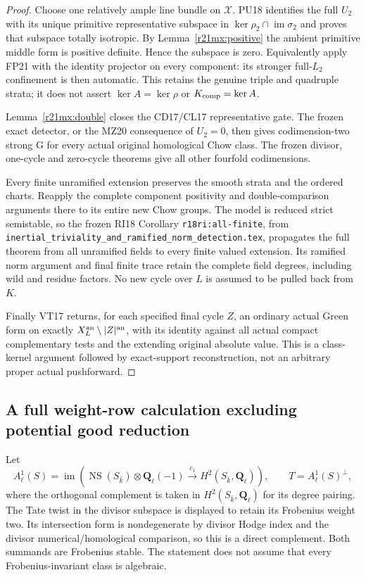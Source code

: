 \begin{proof}
Choose one relatively ample line bundle on $\mathcal X$.  PU18
identifies the full $U_2$ with its unique primitive representative
subspace in $\ker\rho_2\cap\operatorname{im}\sigma_2$ and proves that
subspace totally isotropic.  By Lemma~\ref{r21mx:positive} the ambient
primitive middle form is positive definite.  Hence the subspace is
zero.  Equivalently apply FP21 with the identity projector on every
component: its stronger full-$L_2$ confinement is then automatic.
This retains the genuine triple and quadruple strata; it does not
assert $\ker A=\ker\rho$ or $K_{\rm comp}=\ker A$.

Lemma~\ref{r21mx:double} closes the CD17/CL17 representative gate.
The frozen exact detector, or the MZ20 consequence of $U_2=0$,
then gives codimension-two strong G for every actual original
homological Chow class.  The frozen divisor, one-cycle and zero-cycle
theorems give all other fourfold codimensions.

Every finite unramified extension preserves the smooth strata and
the ordered charts.  Reapply the complete component positivity and
double-comparison arguments there to its entire new Chow groups.
The model is reduced strict semistable, so the frozen RI18
Corollary \texttt{r18ri:all-finite}, from
\texttt{inertial\_triviality\_and\_ramified\_norm\_detection.tex},
propagates the full theorem from all unramified fields to every finite
valued extension.  Its ramified norm argument and final finite trace
retain the complete field degrees, including wild and residue factors.
No new cycle over $L$ is assumed to be pulled back from $K$.

Finally VT17 returns, for each specified final cycle $Z$, an ordinary
actual Green form on exactly $X_L^{\rm an}\setminus|Z|^{\rm an}$,
with its identity against all actual compact complementary tests and
the extending original absolute value.  This is a class-kernel
argument followed by exact-support reconstruction, not an arbitrary
proper actual pushforward.
\end{proof}

\subsection{A full weight-row calculation excluding potential good reduction}

Let
\[
 A_\ell^1(S)=\operatorname{im}\left(
 \operatorname{NS}(S_{\bar k})\otimes\mathbf Q_\ell(-1)
          \xrightarrow{c_1}H^2(S_{\bar k},\mathbf Q_\ell)\right),
 \qquad T=A_\ell^1(S)^\perp,
 \tag{MX21.10}\label{r21mx:T}
\]
where the orthogonal complement is taken in $H^2(S_{\bar k},\mathbf Q_\ell)$
for its degree pairing.  The Tate twist in the divisor subspace is
displayed to retain its Frobenius weight two.  Its intersection form
is nondegenerate by divisor Hodge
index and the divisor numerical/homological comparison, so this is a
direct complement.  Both summands are Frobenius stable.  The statement
does not assume that every Frobenius-invariant class is algebraic.

